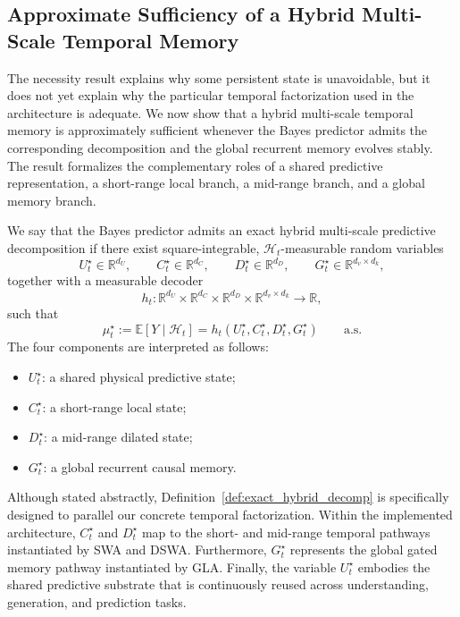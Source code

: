\documentclass{llmxive}
\providecommand{\E}{\mathbb{E}}
\providecommand{\R}{\mathbb{R}}
\providecommand{\cH}{\mathcal{H}}
\begin{document}
\subsection{Approximate Sufficiency of a Hybrid Multi-Scale Temporal Memory}
\label{subsec:kairos_sufficiency}

The necessity result explains why some persistent state is unavoidable, but it does not yet explain why the particular temporal factorization used in the architecture is adequate. We now show that a hybrid multi-scale temporal memory is approximately sufficient whenever the Bayes predictor admits the corresponding decomposition and the global recurrent memory evolves stably. The result formalizes the complementary roles of a shared predictive representation, a short-range local branch, a mid-range branch, and a global memory branch.

\begin{definition}
\label{def:exact_hybrid_decomp}
We say that the Bayes predictor admits an exact hybrid multi-scale predictive decomposition if there exist square-integrable, $\cH_t$-measurable random variables
\[
U_t^\star \in \R^{d_U},
\qquad
C_t^\star \in \R^{d_C},
\qquad
D_t^\star \in \R^{d_D},
\qquad
G_t^\star \in \R^{d_v \times d_k},
\]
together with a measurable decoder
\[
h_t:\R^{d_U}\times\R^{d_C}\times\R^{d_D}\times\R^{d_v\times d_k}\to\R,
\]
such that
\begin{equation}
\mu_t^\star := \E[Y\mid \cH_t] = h_t(U_t^\star,C_t^\star,D_t^\star,G_t^\star)
\qquad \text{a.s.}
\label{eq:exact_decomposition}
\end{equation}
The four components are interpreted as follows:
\begin{itemize}
    \item $U_t^\star$: a shared physical predictive state;
    \item $C_t^\star$: a short-range local state;
    \item $D_t^\star$: a mid-range dilated state;
    \item $G_t^\star$: a global recurrent causal memory.
\end{itemize}
\end{definition}


\begin{remark}
\label{rem:architecture_correspondence}
Although stated abstractly, Definition~\ref{def:exact_hybrid_decomp} is specifically designed to parallel our concrete temporal factorization. Within the implemented architecture, $C_t^\star$ and $D_t^\star$ map to the short- and mid-range temporal pathways instantiated by SWA and DSWA. Furthermore, $G_t^\star$ represents the global gated memory pathway instantiated by GLA. Finally, the variable $U_t^\star$ embodies the shared predictive substrate that is continuously reused across understanding, generation, and prediction tasks.
\end{remark}
\end{document}

